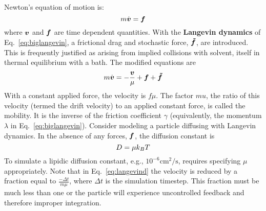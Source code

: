 
 \label{sec:timescales}


Newton's equation of motion is:
\begin{equation}
m \dot{\boldsymbol{v}} = \boldsymbol{f}
\end{equation}
where $\boldsymbol{v}$ and $\boldsymbol{f}$ are time dependent quantities.
With the {\bf Langevin dynamics} of Eq.~\ref{eq:biglangevin}, a frictional drag and stochastic force, $\boldsymbol{\tilde{f}}$, are introduced.
This is frequently justified as arising from implied collisions with solvent, itself in thermal equilibrium with a bath.
The modified equations are
\begin{equation}
m \dot{\boldsymbol{v}} = -\frac{\boldsymbol{v}}{\mu} + \boldsymbol{f} + \boldsymbol{\tilde{f}}
\end{equation}
With a constant applied force, the velocity is $f \mu$.
The factor $mu$, the ratio of this velocity (termed the drift velocity) to an applied constant force, is called the mobility. 
It is the inverse of the friction coefficient $\gamma$ (equivalently, the momentum $\lambda$ in Eq.~\ref{eq:biglangevin}).
Consider modeling a particle diffusing with Langevin dynamics.
In the absence of any forces, $\boldsymbol{f}$, the diffusion constant is
\begin{equation}
D = \mu k_B T
\end{equation}
To simulate a lipidic diffusion constant, e.g., $10^{-6} \textrm{cm}^2/\textrm{s}$, requires specifying $\mu$ appropriately.
Note that in Eq.~\ref{eq:langevind} the velocity is reduced by a fraction equal to $\frac{-\Delta t}{m \mu}$,
where $\Delta t$ is the simulation timestep.
This fraction must be much less than one or the particle will experience uncontrolled feedback and therefore improper integration.



